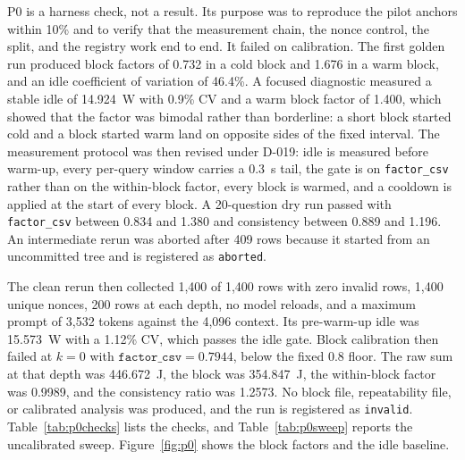 \documentclass[a4paper,fleqn]{cas-sc}
\begin{document}
\label{sec:p0}

P0 is a harness check, not a result. Its purpose was to reproduce the pilot anchors within 10\% and to verify that the measurement chain, the nonce control, the split, and the registry work end to end. It failed on calibration. The first golden run produced block factors of 0.732 in a cold block and 1.676 in a warm block, and an idle coefficient of variation of 46.4\%. A focused diagnostic measured a stable idle of 14.924~W with 0.9\% CV and a warm block factor of 1.400, which showed that the factor was bimodal rather than borderline: a short block started cold and a block started warm land on opposite sides of the fixed interval. The measurement protocol was then revised under D-019: idle is measured before warm-up, every per-query window carries a 0.3~s tail, the gate is on \texttt{factor\_csv} rather than on the within-block factor, every block is warmed, and a cooldown is applied at the start of every block. A 20-question dry run passed with \texttt{factor\_csv} between 0.834 and 1.380 and consistency between 0.889 and 1.196. An intermediate rerun was aborted after 409 rows because it started from an uncommitted tree and is registered as \texttt{aborted}.

The clean rerun then collected 1{,}400 of 1{,}400 rows with zero invalid rows, 1{,}400 unique nonces, 200 rows at each depth, no model reloads, and a maximum prompt of 3{,}532 tokens against the 4{,}096 context. Its pre-warm-up idle was 15.573~W with a 1.12\% CV, which passes the idle gate. Block calibration then failed at $k=0$ with $\texttt{factor\_csv}=0.7944$, below the fixed 0.8 floor. The raw sum at that depth was 446.672~J, the block was 354.847~J, the within-block factor was 0.9989, and the consistency ratio was 1.2573. No block file, repeatability file, or calibrated analysis was produced, and the run is registered as \texttt{invalid}. Table~\ref{tab:p0checks} lists the checks, and Table~\ref{tab:p0sweep} reports the uncalibrated sweep. Figure~\ref{fig:p0} shows the block factors and the idle baseline.
\end{document}
